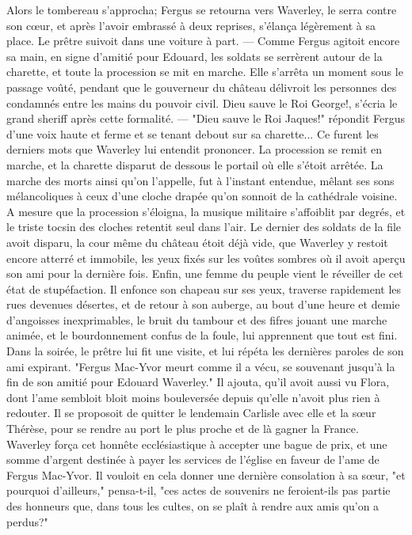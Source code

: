 {Alors le tombereau s’approcha; Fergus se retourna vers Waverley, le serra contre son cœur, et après l’avoir embrassé à deux reprises, s’élança légèrement à sa place. Le prêtre suivoit dans une voiture à part. — Comme Fergus agitoit encore sa main, en signe d’amitié pour Edouard, les soldats se serrèrent autour de la charette, et toute la procession se mit en marche. Elle s’arrêta un moment sous le passage voûté, pendant que le gouverneur du château délivroit les personnes des condamnés entre les mains du pouvoir civil. Dieu sauve le Roi George!, s’écria le grand sheriff après cette formalité. — "Dieu sauve le Roi Jaques!" répondit Fergus d’une voix haute et ferme et se tenant debout sur sa charette... Ce furent les derniers mots que Waverley lui entendit prononcer.
La procession se remit en marche, et la charette disparut de dessous le portail où\setcounter{page}{392} elle s'étoit arrêtée. La marche des morts ainsi qu'on l'appelle, fut à l'instant entendue, mêlant ses sons mélancoliques à ceux d'une cloche drapée qu'on sonnoit de la cathédrale voisine. A mesure que la procession s'éloigna, la musique militaire s'affoiblit par degrés, et le triste tocsin des cloches retentit seul dans l'air.
Le dernier des soldats de la file avoit disparu, la cour même du château étoit déjà vide, que Waverley y restoit encore atterré et immobile, les yeux fixés sur les voûtes sombres où il avoit aperçu son ami pour la dernière fois. Enfin, une femme du peuple vient le réveiller de cet état de stupéfaction. Il enfonce son chapeau sur ses yeux, traverse rapidement les rues devenues désertes, et de retour à son auberge, au bout d'une heure et demie d'angoisses inexprimables, le bruit du tambour et des fifres jouant une marche animée, et le bourdonnement confus de la foule, lui apprennent que tout est fini.
Dans la soirée, le prêtre lui fit une visite, et lui répéta les dernières paroles de son ami expirant. "Fergus Mac-Yvor meurt comme il a vécu, se souvenant jusqu'à la fin de son amitié pour Edouard Waverley." Il ajouta, qu'il avoit aussi vu Flora, dont l'ame sembloit\setcounter{page}{393} bloit moins bouleversée depuis qu'elle n'avoit plus rien à redouter. Il se proposoit de quitter le lendemain Carlisle avec elle et la sœur Thérèse, pour se rendre au port le plus proche et de là gagner la France. Waverley força cet honnête ecclésiastique à accepter une bague de prix, et une somme d'argent destinée à payer les services de l'église en faveur de l'ame de Fergus Mac-Yvor. Il vouloit en cela donner une dernière consolation à sa sœur, "et pourquoi d'ailleurs," pensa-t-il, "ces actes de souvenirs ne feroient-ils pas partie des honneurs que, dans tous les cultes, on se plaît à rendre aux amis qu'on a perdus?"
}
